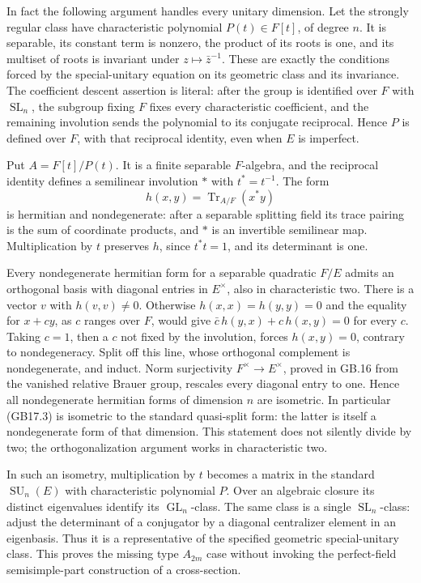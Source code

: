 \documentclass[
  11pt,
]{article}
\begin{document}
In fact the following argument handles every unitary dimension. Let the
strongly regular class have characteristic polynomial \(P(t)\in F[t]\),
of degree \(n\). It is separable, its constant term is nonzero, the
product of its roots is one, and its multiset of roots is invariant
under \(z\mapsto\bar z^{-1}\). These are exactly the conditions forced
by the special-unitary equation on its geometric class and its
invariance. The coefficient descent assertion is literal: after the
group is identified over \(F\) with \(\operatorname{SL}_n\), the
subgroup fixing \(F\) fixes every characteristic coefficient, and the
remaining involution sends the polynomial to its conjugate reciprocal.
Hence \(P\) is defined over \(F\), with that reciprocal identity, even
when \(E\) is imperfect.

Put \(A=F[t]/P(t)\). It is a finite separable \(F\)-algebra, and the
reciprocal identity defines a semilinear involution \(*\) with
\(t^*=t^{-1}\). The form \[
                    h(x,y)=\operatorname{Tr}_{A/F}(x^*y)    \tag{GB17.3}
\] is hermitian and nondegenerate: after a separable splitting field its
trace pairing is the sum of coordinate products, and \(*\) is an
invertible semilinear map. Multiplication by \(t\) preserves \(h\),
since \(t^*t=1\), and its determinant is one.

Every nondegenerate hermitian form for a separable quadratic \(F/E\)
admits an orthogonal basis with diagonal entries in \(E^\times\), also
in characteristic two. There is a vector \(v\) with \(h(v,v)\ne0\).
Otherwise \(h(x,x)=h(y,y)=0\) and the equality for \(x+cy\), as \(c\)
ranges over \(F\), would give \(\bar c\,h(y,x)+c\,h(x,y)=0\) for every
\(c\). Taking \(c=1\), then a \(c\) not fixed by the involution, forces
\(h(x,y)=0\), contrary to nondegeneracy. Split off this line, whose
orthogonal complement is nondegenerate, and induct. Norm surjectivity
\(F^\times\to E^\times\), proved in GB.16 from the vanished relative
Brauer group, rescales every diagonal entry to one. Hence all
nondegenerate hermitian forms of dimension \(n\) are isometric. In
particular (GB17.3) is isometric to the standard quasi-split form: the
latter is itself a nondegenerate form of that dimension. This statement
does not silently divide by two; the orthogonalization argument works in
characteristic two.

In such an isometry, multiplication by \(t\) becomes a matrix in the
standard \(\operatorname{SU}_n(E)\) with characteristic polynomial
\(P\). Over an algebraic closure its distinct eigenvalues identify its
\(\operatorname{GL}_n\)-class. The same class is a single
\(\operatorname{SL}_n\)-class: adjust the determinant of a conjugator by
a diagonal centralizer element in an eigenbasis. Thus it is a
representative of the specified geometric special-unitary class. This
proves the missing type \(A_{2m}\) case without invoking the
perfect-field semisimple-part construction of a cross-section.
\end{document}
